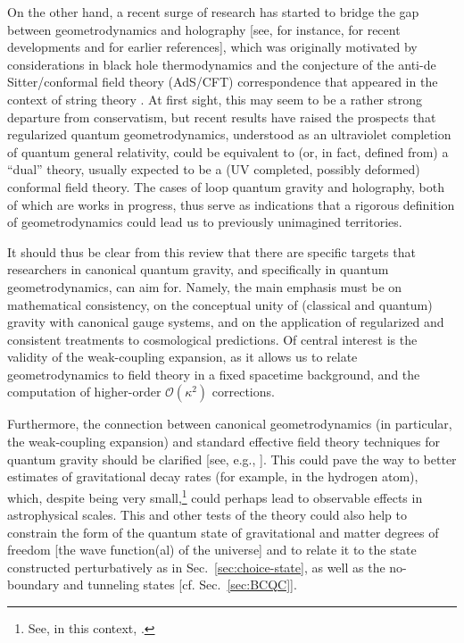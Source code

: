 \documentclass[12pt]{iopart}
\def\Ob{\mathcal{O}}
\begin{document}
On the other hand, a recent surge of research has started to bridge the gap between geometrodynamics and holography [see, for instance, \citet{Chowdhury:2021nxw,Witten:2022xxp,Araujo-Regado:2022gvw} for recent developments and \citet{Lifschytz:2000bj,Freidel:2008sh} for earlier references], which was originally motivated by considerations in black hole thermodynamics \citep{tHooft:1999rgb} and the conjecture of the anti-de Sitter/conformal field theory (AdS/CFT) correspondence that appeared in the context of string theory \citep{Maldacena:1997re}. At first sight, this may seem to be a rather strong departure from conservatism, but recent results have raised the prospects that regularized quantum geometrodynamics, understood as an ultraviolet completion of quantum general relativity, could be equivalent to (or, in fact, defined from) a ``dual'' theory, usually expected to be a (UV completed, possibly deformed) conformal field theory. The cases of loop quantum gravity and holography, both of which are works in progress, thus serve as indications that a rigorous definition of geometrodynamics could lead us to previously unimagined territories.

It should thus be clear from this review that there are specific targets that researchers in canonical quantum gravity, and specifically in quantum geometrodynamics, can aim for. Namely, the main emphasis must be on mathematical consistency, on the conceptual unity of (classical and quantum) gravity with canonical gauge systems, and on the application of regularized and consistent treatments to cosmological predictions. Of central interest is the validity of the weak-coupling expansion, as it allows us to relate geometrodynamics to field theory in a fixed spacetime background, and the computation of higher-order $\Ob(\kappa^2)$ corrections.

Furthermore, the connection between canonical geometrodynamics (in particular, the weak-coupling expansion) and standard effective field theory techniques for quantum gravity \citep{Burgess:2003jk,Donoghue:2017ovt} should be clarified [see, e.g., \citet{Barvinsky:1997hp}]. This could pave the way to better estimates of gravitational decay rates (for example, in the hydrogen atom), which, despite being very small,\footnote{See, in this context, \citet{Bronstein,Weinberg:1972kfs,Kiefer:book}.} could perhaps lead to observable effects in astrophysical scales. This and other tests of the theory could also help to constrain the form of the quantum state of gravitational and matter degrees of freedom [the wave function(al) of the universe] and to relate it to the state constructed perturbatively as in Sec.~\ref{sec:choice-state}, as well as the no-boundary and tunneling states [cf. Sec.~\ref{sec:BCQC}].
\end{document}
